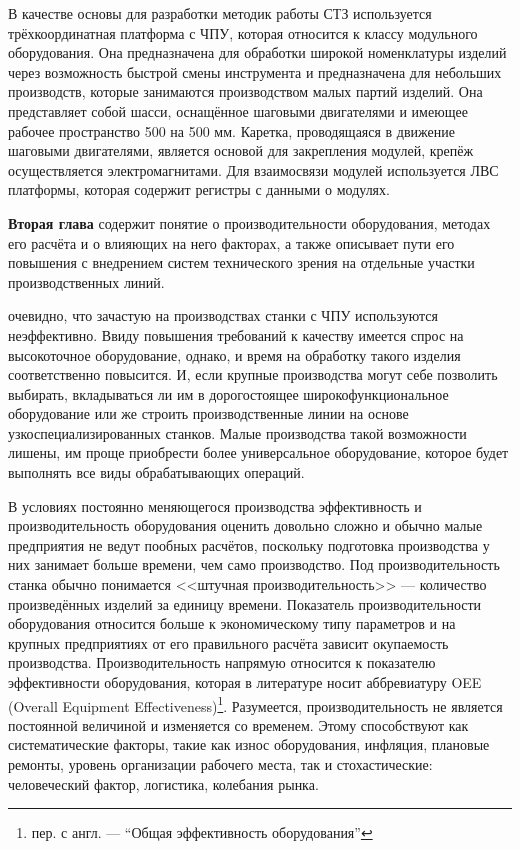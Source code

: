 В качестве основы для разработки методик работы СТЗ используется трёхкоординатная платформа с ЧПУ, которая относится к классу модульного оборудования. Она предназначена для обработки широкой номенклатуры изделий через возможность быстрой смены инструмента и предназначена для небольших производств, которые занимаются производством малых партий изделий. Она представляет собой шасси, оснащённое шаговыми двигателями и имеющее рабочее пространство 500 на 500 мм. Каретка, проводящаяся в движение шаговыми двигателями, является основой для закрепления модулей, крепёж осуществляется электромагнитами. Для взаимосвязи модулей используется ЛВС платформы, которая содержит регистры с данными о модулях.

\textbf{Вторая глава} содержит понятие о производительности оборудования, методах его расчёта и о влияющих на него факторах, а также описывает пути его повышения с внедрением систем технического зрения на отдельные участки производственных линий.

очевидно, что зачастую на производствах станки с ЧПУ используются неэффективно. Ввиду повышения требований к качеству имеется спрос на высокоточное оборудование, однако, и время на обработку такого изделия соответственно повысится. И, если крупные производства могут себе позволить выбирать, вкладываться ли им в дорогостоящее широкофункциональное оборудование или же строить производственные линии на основе узкоспециализированных станков. Малые производства такой возможности лишены, им проще приобрести более универсальное оборудование, которое будет выполнять все виды обрабатывающих операций.

В условиях постоянно меняющегося производства эффективность и производительность оборудования оценить довольно сложно и обычно малые предприятия не ведут пообных расчётов, поскольку подготовка производства у них занимает больше времени, чем само производство. Под производительность станка обычно понимается <<штучная производительность>> --- количество произведённых изделий за единицу времени. Показатель производительности оборудования относится больше к экономическому типу параметров и на крупных предприятиях от его правильного расчёта зависит окупаемость производства. Производительность напрямую относится к показателю эффективности оборудования, которая в литературе носит аббревиатуру OEE (Overall Equipment Effectiveness)\footnote{пер. с англ. --- ``Общая эффективность оборудования''}. Разумеется, производительность не является постоянной величиной и изменяется со временем. Этому способствуют как систематические факторы, такие как износ оборудования, инфляция, плановые ремонты, уровень организации рабочего места, так и стохастические: человеческий фактор, логистика, колебания рынка.

